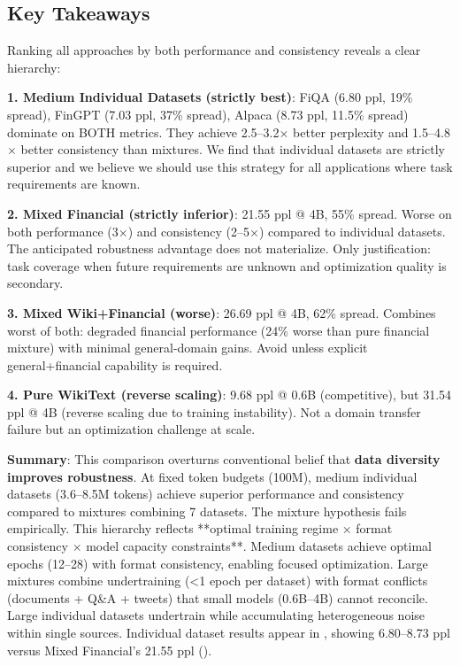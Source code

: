 

\subsection{Key Takeaways}

Ranking all approaches by both performance and consistency reveals a clear hierarchy:

\textbf{1. Medium Individual Datasets (strictly best)}: FiQA (6.80 ppl, 19\% spread), FinGPT (7.03 ppl, 37\% spread), Alpaca (8.73 ppl, 11.5\% spread) dominate on BOTH metrics. They achieve 2.5–3.2$\times$ better perplexity and 1.5–4.8$\times$ better consistency than mixtures. We find that individual datasets are strictly superior and we believe we should use this strategy for all applications where task requirements are known.

\textbf{2. Mixed Financial (strictly inferior)}: 21.55 ppl @ 4B, 55\% spread. Worse on both performance (3$\times$) and consistency (2–5$\times$) compared to individual datasets. The anticipated robustness advantage does not materialize. Only justification: task coverage when future requirements are unknown and optimization quality is secondary.

\textbf{3. Mixed Wiki+Financial (worse)}: 26.69 ppl @ 4B, 62\% spread. Combines worst of both: degraded financial performance (24\% worse than pure financial mixture) with minimal general-domain gains. Avoid unless explicit general+financial capability is required.

\textbf{4. Pure WikiText (reverse scaling)}: 9.68 ppl @ 0.6B (competitive), but 31.54 ppl @ 4B (reverse scaling due to training instability). Not a domain transfer failure but an optimization challenge at scale.

\textbf{Summary}: This comparison overturns conventional belief that \textbf{data diversity improves robustness}. At fixed token budgets (100M), medium individual datasets (3.6–8.5M tokens) achieve superior performance and consistency compared to mixtures combining 7 datasets. The mixture hypothesis fails empirically. This hierarchy reflects **optimal training regime × format consistency × model capacity constraints**. Medium datasets achieve optimal epochs (12–28) with format consistency, enabling focused optimization. Large mixtures combine undertraining (<1 epoch per dataset) with format conflicts (documents + Q\&A + tweets) that small models (0.6B–4B) cannot reconcile. Large individual datasets undertrain while accumulating heterogeneous noise within single sources. Individual dataset results appear in , showing 6.80–8.73 ppl versus Mixed Financial's 21.55 ppl ().

